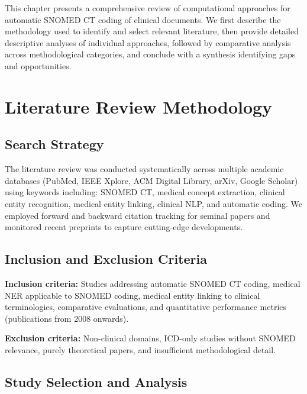 
This chapter presents a comprehensive review of computational approaches for automatic SNOMED CT coding of clinical documents. We first describe the methodology used to identify and select relevant literature, then provide detailed descriptive analyses of individual approaches, followed by comparative analysis across methodological categories, and conclude with a synthesis identifying gaps and opportunities.

\section{Literature Review Methodology}

\subsection{Search Strategy}

The literature review was conducted systematically across multiple academic databases (PubMed, IEEE Xplore, ACM Digital Library, arXiv, Google Scholar) using keywords including: SNOMED CT, medical concept extraction, clinical entity recognition, medical entity linking, clinical NLP, and automatic coding. We employed forward and backward citation tracking for seminal papers and monitored recent preprints to capture cutting-edge developments.

\subsection{Inclusion and Exclusion Criteria}

\textbf{Inclusion criteria:} Studies addressing automatic SNOMED CT coding, medical NER applicable to SNOMED coding, medical entity linking to clinical terminologies, comparative evaluations, and quantitative performance metrics (publications from 2008 onwards).

\textbf{Exclusion criteria:} Non-clinical domains, ICD-only studies without SNOMED relevance, purely theoretical papers, and insufficient methodological detail.

\subsection{Study Selection and Analysis}

